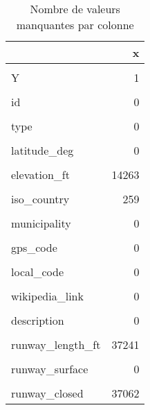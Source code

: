 \documentclass[
]{compterendu}
\begin{document}
\begin{table}[!h]
\centering
\caption{\label{tab:unnamed-chunk-4}Nombre de valeurs manquantes par colonne}
\centering
\begin{tabular}[t]{l|r}
\hline
\textbf{ } & \textbf{x}\\
\hline
\cellcolor{gray!10}{X} & \cellcolor{gray!10}{1}\\
\hline
Y & 1\\
\hline
\cellcolor{gray!10}{OBJECTID} & \cellcolor{gray!10}{0}\\
\hline
id & 0\\
\hline
\cellcolor{gray!10}{airport\_ident} & \cellcolor{gray!10}{0}\\
\hline
type & 0\\
\hline
\cellcolor{gray!10}{name} & \cellcolor{gray!10}{0}\\
\hline
latitude\_deg & 0\\
\hline
\cellcolor{gray!10}{longitude\_deg} & \cellcolor{gray!10}{0}\\
\hline
elevation\_ft & 14263\\
\hline
\cellcolor{gray!10}{continent} & \cellcolor{gray!10}{36226}\\
\hline
iso\_country & 259\\
\hline
\cellcolor{gray!10}{iso\_region} & \cellcolor{gray!10}{0}\\
\hline
municipality & 0\\
\hline
\cellcolor{gray!10}{scheduled\_service} & \cellcolor{gray!10}{0}\\
\hline
gps\_code & 0\\
\hline
\cellcolor{gray!10}{iata\_code} & \cellcolor{gray!10}{0}\\
\hline
local\_code & 0\\
\hline
\cellcolor{gray!10}{home\_link} & \cellcolor{gray!10}{0}\\
\hline
wikipedia\_link & 0\\
\hline
\cellcolor{gray!10}{keywords} & \cellcolor{gray!10}{0}\\
\hline
description & 0\\
\hline
\cellcolor{gray!10}{frequency\_mhz} & \cellcolor{gray!10}{64383}\\
\hline
runway\_length\_ft & 37241\\
\hline
\cellcolor{gray!10}{runway\_width\_ft} & \cellcolor{gray!10}{39483}\\
\hline
runway\_surface & 0\\
\hline
\cellcolor{gray!10}{runway\_lighted} & \cellcolor{gray!10}{37062}\\
\hline
runway\_closed & 37062\\
\hline
\end{tabular}
\end{table}
\end{document}
